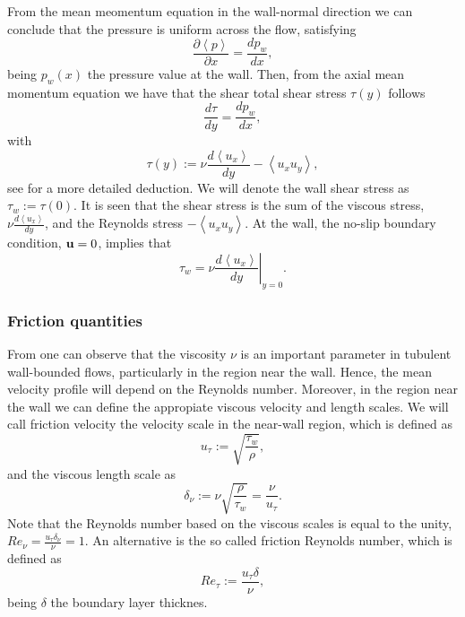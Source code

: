 From the mean meomentum equation in the wall-normal direction we can conclude that the pressure is uniform across the flow, satisfying $$ \frac{\partial\left\langle p\right\rangle}{\partial x}=\frac{d p_w}{dx}, $$ being $ p_w(x) $ the pressure value at the wall. Then, from the axial mean momentum equation we have that the shear total shear stress $ \tau(y) $ follows
\begin{equation}
\label{eq-shear_stress_law}
\frac{d\tau}{dy}=\frac{d p_w}{dx},
\end{equation}
with
\begin{equation}
\label{eq-shear_stress}
\tau(y):=\nu\frac{d\left\langle u_x\right\rangle}{dy}-\left\langle u_xu_y\right\rangle,
\end{equation}
see \cite{pope} for a more detailed deduction. We will denote the wall shear stress as $ \tau_w:=\tau(0) $. It is seen that the shear stress is the sum of the viscous stress, $ \nu\frac{d\left\langle u_x\right\rangle}{dy} $, and the Reynolds stress $ -\left\langle u_xu_y\right\rangle $. At the wall, the no-slip boundary condition, $ {\bf u}=0 $, implies that
\begin{equation}
\label{eq-wall_shear_stress}
\tau_w=\nu\left.\frac{d\left\langle u_x\right\rangle}{dy}\right|_{y=0}.
\end{equation}

\subsubsection{Friction quantities}
From  one can observe that the viscosity $ \nu $ is an important parameter in tubulent wall-bounded flows, particularly in the region near the wall. Hence, the mean velocity profile  will depend on the Reynolds number. Moreover, in the region near the wall we can define the appropiate viscous velocity and length scales. We will call friction velocity the velocity scale in the near-wall region, which is defined as
\begin{equation}
\label{eq-friction_velocity}
u_\tau:=\sqrt{\frac{\tau_w}{\rho}},
\end{equation}
and the viscous length scale as 
\begin{equation}
\label{eq-viscous_lenghtscale}
\delta_\nu:=\nu\sqrt{\frac{\rho}{\tau_w}}=\frac{\nu}{u_\tau}.
\end{equation}
Note that the Reynolds number based on the viscous scales is equal to the unity, $ Re_\nu = \frac{u_\tau\delta_\nu}{\nu}=1 $. An alternative is the so called friction Reynolds number, which is defined as
\begin{equation}
\label{eq-friction_reynolds}
Re_\tau:=\frac{u_\tau\delta}{\nu},
\end{equation}
being $ \delta $ the boundary layer thicknes. 

